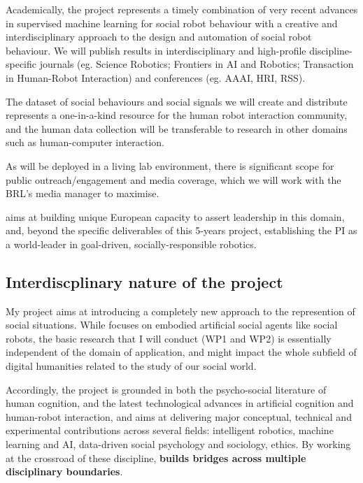 \begin{rewrite}

Academically, the \project project represents a timely combination of
very recent advances in supervised machine learning for social robot
behaviour with a creative and interdisciplinary approach to the design
and automation of social robot behaviour. 
We will publish \project results in interdisciplinary and high-profile
discipline-specific journals (eg. Science Robotics; Frontiers in AI and
Robotics; Transaction in Human-Robot Interaction) and conferences (eg. AAAI,
HRI, RSS).

The dataset of social behaviours and social signals we will create and
distribute represents a one-in-a-kind resource for the human robot
interaction community, and the human data collection will be
transferable to research in other domains such as human-computer
interaction.

As \project will be deployed in a living lab environment, there is
significant scope for public outreach/engagement and media coverage,
which we will work with the BRL's media manager to maximise.


\project aims at building unique European capacity to assert leadership in this
domain, and, beyond the specific deliverables of this 5-years project,
establishing the PI as a world-leader in goal-driven, socially-responsible
robotics.

\end{rewrite}

\subsection{Interdiscplinary nature of the project}

My project aims at introducing a completely new approach to the represention of
social situations. While \project focuses on embodied artificial social agents
like social robots, the basic research that I will conduct (WP1 and WP2) is
essentially independent of the domain of application, and might impact the whole
subfield of digital humanities related to the study of our social world.

Accordingly, the project is grounded in both the psycho-social literature of
human cognition, and the latest technological advances in artificial cognition
and human-robot interaction, and aims at delivering major conceptual, technical
and experimental contributions across several fields: intelligent robotics,
machine learning and AI, data-driven social psychology and sociology, ethics. By
working at the crossroad of these discipline, \textbf{\project builds bridges
across multiple disciplinary boundaries}.

